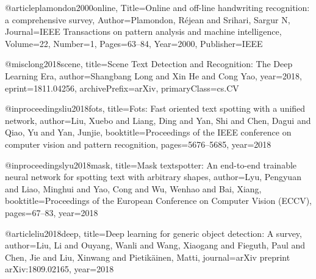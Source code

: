 @article{plamondon2000online,
	Title={Online and off-line handwriting recognition: a comprehensive survey},
	Author={Plamondon, R{\'e}jean and Srihari, Sargur N},
	Journal={IEEE Transactions on pattern analysis and machine intelligence},
	Volume={22},
	Number={1},
	Pages={63--84},
	Year={2000},
	Publisher={IEEE}
}

@misc{long2018scene,
    title={Scene Text Detection and Recognition: The Deep Learning Era},
    author={Shangbang Long and Xin He and Cong Yao},
    year={2018},
    eprint={1811.04256},
    archivePrefix={arXiv},
    primaryClass={cs.CV}
}

@inproceedings{liu2018fots,
  title={Fots: Fast oriented text spotting with a unified network},
  author={Liu, Xuebo and Liang, Ding and Yan, Shi and Chen, Dagui and Qiao, Yu and Yan, Junjie},
  booktitle={Proceedings of the IEEE conference on computer vision and pattern recognition},
  pages={5676--5685},
  year={2018}
}

@inproceedings{lyu2018mask,
  title={Mask textspotter: An end-to-end trainable neural network for spotting text with arbitrary shapes},
  author={Lyu, Pengyuan and Liao, Minghui and Yao, Cong and Wu, Wenhao and Bai, Xiang},
  booktitle={Proceedings of the European Conference on Computer Vision (ECCV)},
  pages={67--83},
  year={2018}
}

@article{liu2018deep,
  title={Deep learning for generic object detection: A survey},
  author={Liu, Li and Ouyang, Wanli and Wang, Xiaogang and Fieguth, Paul and Chen, Jie and Liu, Xinwang and Pietik{\"a}inen, Matti},
  journal={arXiv preprint arXiv:1809.02165},
  year={2018}
}